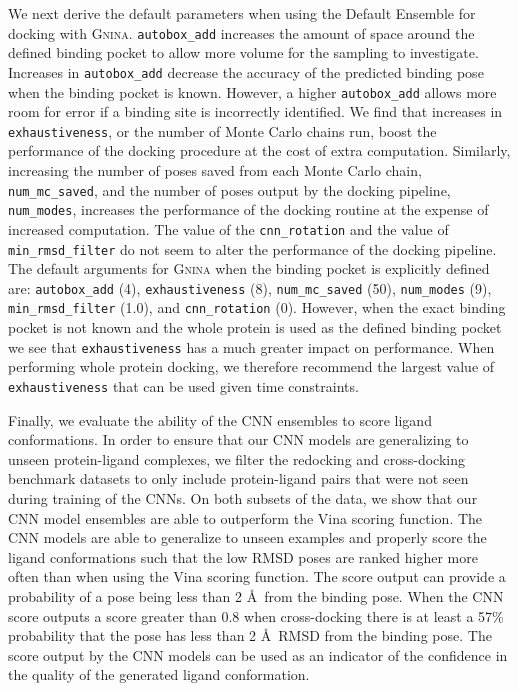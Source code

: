 \documentclass[journal=jcisd8,manuscript=article]{achemso}
\begin{document}
We next derive the default parameters when using the Default Ensemble for docking with \textsc{Gnina}. \texttt{autobox\_add} increases the amount of space around the defined binding pocket to allow more volume for the sampling to investigate. Increases in \texttt{autobox\_add} decrease the accuracy of the predicted binding pose when the binding pocket is known. However, a higher \texttt{autobox\_add} allows more room for error if a binding site is incorrectly identified. We find that increases in \texttt{exhaustiveness}, or the number of Monte Carlo chains run, boost the performance of the docking procedure at the cost of extra computation. Similarly, increasing the number of poses saved from each Monte Carlo chain, \texttt{num\_mc\_saved}, and the number of poses output by the docking pipeline, \texttt{num\_modes}, increases the performance of the docking routine at the expense of increased computation. The value of the \texttt{cnn\_rotation} and the value of \texttt{min\_rmsd\_filter} do not seem to alter the performance of the docking pipeline. The default arguments for \textsc{Gnina} when the binding pocket is explicitly defined are: \texttt{autobox\_add} (4), \texttt{exhaustiveness} (8), \texttt{num\_mc\_saved} (50), \texttt{num\_modes} (9), \texttt{min\_rmsd\_filter} (1.0), and \texttt{cnn\_rotation} (0). However, when the exact binding pocket is not known and the whole protein is used as the defined binding pocket we see that \texttt{exhaustiveness} has a much greater impact on performance. When performing whole protein docking, we therefore recommend the largest value of \texttt{exhaustiveness} that can be used given time constraints.

Finally, we evaluate the ability of the CNN ensembles to score ligand conformations. In order to ensure that our CNN models are generalizing to unseen protein-ligand complexes, we filter the redocking and cross-docking benchmark datasets to only include protein-ligand pairs that were not seen during training of the CNNs. On both subsets of the data, we show that our CNN model ensembles are able to outperform the Vina scoring function. The CNN models are able to generalize to unseen examples and properly score the ligand conformations such that the low RMSD poses are ranked higher more often than when using the Vina scoring function. The score output can provide a probability of a pose being less than 2 \AA~from the binding pose. When the CNN score outputs a score greater than 0.8 when cross-docking there is at least a 57\% probability that the pose has less than 2 \AA~RMSD from the binding pose. The score output by the CNN models can be used as an indicator of the confidence in the quality of the generated ligand conformation.
\end{document}
